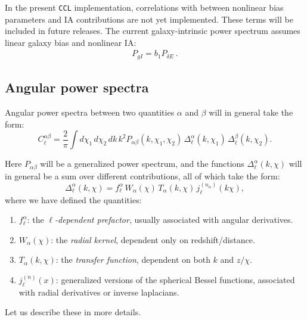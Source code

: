 \documentclass[\docopts]{\docclass}
\newcommand{\ccl}{{\tt CCL}\xspace}
\begin{document}
In the present \ccl implementation, correlations with between nonlinear bias parameters and IA contributions are not yet implemented. These terms will be included in future releases. The current galaxy-intrinsic power spectrum assumes linear galaxy bias and nonlinear IA:
\begin{align}
    P_{gI} = b_1 P_{\delta E}~.
\end{align}

\subsection{Angular power spectra}
\label{sec:cl}

Angular power spectra between two quantities $\alpha$ and $\beta$ will in general take the form:
\begin{equation}
  C^{\alpha\beta}_\ell=\frac{2}{\pi}\int d\chi_1\,d\chi_2\,dk\,k^2 P_{\alpha\beta}(k,\chi_1,\chi_2)\,\Delta^\alpha_\ell(k,\chi_1)\,\Delta^\beta_\ell(k,\chi_2).
\end{equation}

Here $P_{\alpha\beta}$ will be a generalized power spectrum, and the functions $\Delta^\alpha_\ell(k,\chi)$ will in general be a sum over
different contributions, all of which take the form:
\begin{equation}\label{eq:generalized_tracer}
  \Delta^\alpha_\ell(k,\chi)=f^\alpha_\ell\,W_\alpha(\chi)\,T_\alpha(k,\chi)\,j^{(n_\alpha)}_\ell(k\chi),
\end{equation}
where we have defined the quantities:
\begin{enumerate}
 \item $f^\alpha_\ell$: the \emph{$\ell$-dependent prefactor}, usually associated with angular derivatives.
 \item $W_\alpha(\chi)$: the \emph{radial kernel}, dependent only on redshift/distance.
 \item $T_\alpha(k,\chi)$: the \emph{transfer function}, dependent on both $k$ and $z/\chi$.
 \item $j^{(n)}_\ell(x)$: generalized versions of the spherical Bessel functions, associated with radial derivatives or inverse laplacians.
\end{enumerate}
Let us describe these in more details.
\end{document}
